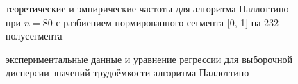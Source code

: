 \documentclass[a4paper]{article}
\begin{document}
\begin{figure}[!]
	\caption{теоретические и эмпирические частоты для алгоритма Паллоттино при $n = 80$ с разбиением нормированного сегмента [0, 1] на 232 полусегмента}
	\label{image1}
\end{figure}

\begin{figure}[!]
	\caption{экспериментальные данные и уравнение регрессии для выборочной дисперсии значений трудоёмкости алгоритма Паллоттино}
	\label{image2}
\end{figure}
\end{document}
